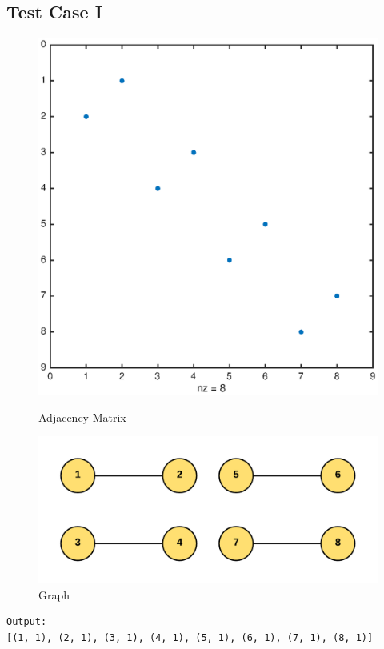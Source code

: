\subsection{Test Case I}

\begin{figure}[H]
  \includegraphics[width=\linewidth]{spy1.eps}
  \caption{Adjacency Matrix}
\endminipage\hfill
{}
  \includegraphics[width=\linewidth]{graph1}
  \caption{Graph}
\endminipage
\end{figure}
\begin{verbatim}
Output:
[(1, 1), (2, 1), (3, 1), (4, 1), (5, 1), (6, 1), (7, 1), (8, 1)]
\end{verbatim}

